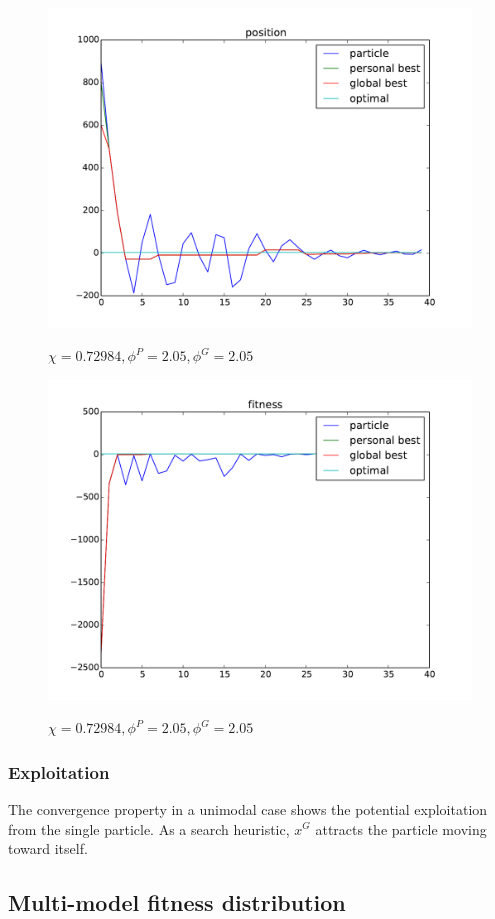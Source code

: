 \begin{figure}[ht]
\centering
\includegraphics[width=.7\linewidth]{./simfig/case1/position1-2} 
\label{fig:case1-2:position}
\caption{$ \chi = 0.72984 , \phi^{P} = 2.05 , \phi^{G} = 2.05 $ }
\end{figure}
  
\begin{figure}[ht]
\centering
\includegraphics[width=.7\linewidth]{./simfig/case1/fitness1-2} 
\label{fig:case1-2:fitness} 
\caption{$ \chi = 0.72984 , \phi^{P} = 2.05 , \phi^{G} = 2.05 $ }
\end{figure}

\subsubsection{Exploitation}

The convergence property in a unimodal case shows the potential exploitation from the single particle.
As a search heuristic, $ x^{G} $ attracts the particle moving toward itself.


\subsection{Multi-model fitness distribution}

